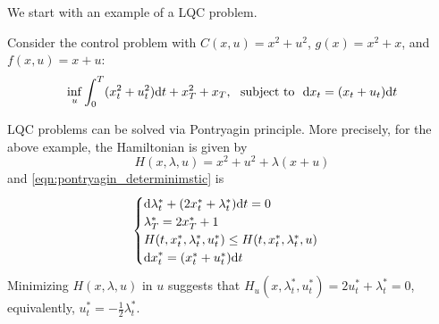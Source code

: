 \documentclass[11pt]{book}
\newcommand{\dd}{\text{\normalfont d}}
\newcommand{\dt}{\text{\normalfont d}t}
\newcommand{\dx}{\text{\normalfont d}x}
\begin{document}
We start with an example of a LQC problem. 
\begin{eg}\label{eg:lqc}
    Consider the control problem with $C(x,u)= x^2 +  u^2$, $g(x) = x^2 +  x$, and $f(x,u)=x + u$:
\begin{equation}
    \inf_{u}\int_0^T(x_t^2 + u_t^2 ){\dt} + x^2_T + x_T,~\text{ subject to  }~{\dx}_t=( x_t +  u_t){\dt}
\end{equation}
\end{eg}
LQC problems can be solved via Pontryagin principle. More precisely,  for the above example, the Hamiltonian is given by
\[
H(x,\lambda,u) = x^2 + u^2 + \lambda ( x + u)
\]
and \eqref{eqn:pontryagin_determinimstic} is 
\begin{equation}\label{eg:pontryagin_lqc}
    \begin{cases}
        {\dd}\lambda^*_t+ (2x^*_t + \lambda^*_t ){\dt}=0\\
        \lambda^*_T= 2x^*_T + 1\\
        H(t,x^*_t,\lambda^*_t,u^*_t)\le H(t,x^*_t,\lambda^*_t,u)\\
        {\dx}^*_t=( x^*_t + u^*_t){\dt}
        \end{cases}
\end{equation}
Minimizing $H(x,\lambda,u)$ in $u$ suggests that $H_u(x,\lambda^*_t,u^*_t)=2u^*_t+  \lambda^*_t =0$, equivalently, $u^*_t=-\frac{1}{2}\lambda^*_t$.
\end{document}
